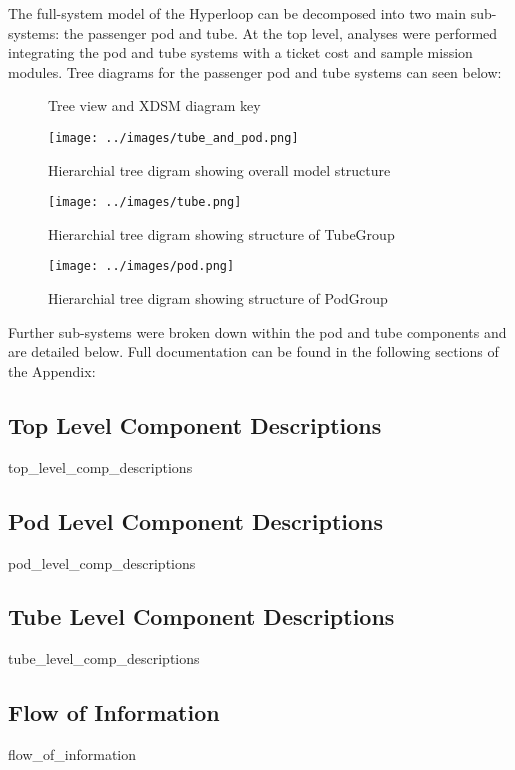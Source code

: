 The full-system model of the Hyperloop can be decomposed into two main sub-systems: the passenger pod and tube. At the top level, analyses were performed integrating the pod and tube systems with a ticket cost  and sample mission modules. Tree diagrams for the passenger pod and tube systems can seen below:


\usetikzlibrary{arrows,chains,positioning,scopes,shapes.geometric,shapes.misc,shadows}
\begin{figure}
	\centering
	\caption{Tree view and XDSM diagram key}
	\label{fig:key}
\end{figure}

\begin{figure}
	\centering
	\texttt{[image: ../images/tube\_and\_pod.png]}
	\caption{Hierarchial tree digram showing overall model structure}
	\label{fig:tree:tube_and_pod}
\end{figure}

\begin{figure}
	\centering
	\texttt{[image: ../images/tube.png]}
	\caption{Hierarchial tree digram showing structure of TubeGroup}
	\label{fig:tree:tube}
\end{figure}

\begin{figure}
	\centering
	\texttt{[image: ../images/pod.png]}
	\caption{Hierarchial tree digram showing structure of PodGroup}
	\label{fig:tube}
\end{figure}

Further sub-systems were broken down within the pod and tube components and are detailed below. Full documentation can be found in the following sections of the Appendix:

\subsection{Top Level Component Descriptions}
	{top_level_comp_descriptions}
\subsection{Pod Level Component Descriptions}
	{pod_level_comp_descriptions}
\subsection{Tube Level Component Descriptions}
	{tube_level_comp_descriptions}
\subsection{Flow of Information}
	{flow_of_information}


